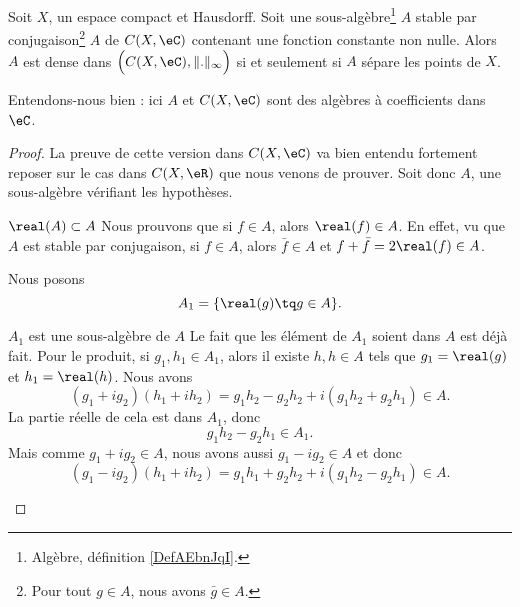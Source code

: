 \begin{theorem} \label{ThoWmAzSMF}
    Soit \( X\), un espace compact et Hausdorff. Soit une sous-algèbre\footnote{Algèbre, définition \ref{DefAEbnJqI}.} \( A\) stable par conjugaison\footnote{Pour tout \( g\in A\), nous avons \( \bar g\in A\).} \( A\) de \( C(X,\eC)\) contenant une fonction constante non nulle. Alors \( A\) est dense dans \( \Big( C(X,\eC),\| . \|_{\infty}\Big)\) si et seulement si \( A\) sépare les points de \(X\).

    Entendons-nous bien : ici \( A\) et \( C(X,\eC)\) sont des algèbres à coefficients dans \( \eC\).
\end{theorem}

\begin{proof}
    La preuve de cette version dans \( C(X,\eC)\) va bien entendu fortement reposer sur le cas dans \( C(X,\eR)\) que nous venons de prouver. Soit donc \( A\), une sous-algèbre vérifiant les hypothèses.
    \begin{subproof}
        \item[\( \real(A)\subset A\)]
            Nous prouvons que si \( f\in A\), alors \( \real(f)\in A\). En effet, vu que \( A\) est stable par conjugaison, si \( f\in A\), alors \( \bar f\in A\) et \( f+\bar f=2\real(f)\in A\).
    \end{subproof}
    Nous posons
    \begin{equation}
        A_1=\{ \real(g)\tq g\in A \}.
    \end{equation}
    \begin{subproof}
        \item[\( A_1\) est une sous-algèbre de \( A\)]
            Le fait que les élément de \( A_1\) soient dans \( A\) est déjà fait. Pour le produit, si \( g_1,h_1\in A_1\), alors il existe \( h,h\in A\) tels que \( g_1=\real(g)\) et \( h_1=\real(h)\). Nous avons
            \begin{equation}
                (g_1+ig_2)(h_1+ih_2)=g_1h_2-g_2h_2+i(g_1h_2+g_2h_1)\in A.
            \end{equation}
            La partie réelle de cela est dans \( A_1\), donc
            \begin{equation}        \label{EQooYAGUooJVpaEa}
                g_1h_2-g_2h_1\in A_1.
            \end{equation}
            Mais comme \( g_1+ig_2\in A\), nous avons aussi \( g_1-ig_2\in A \) et donc
            \begin{equation}
                (g_1-ig_2)(h_1+ih_2)=g_1h_1+g_2h_2+i(g_1h_2-g_2h_1)\in A.

\end{equation}
\end{subproof}
\end{proof}
